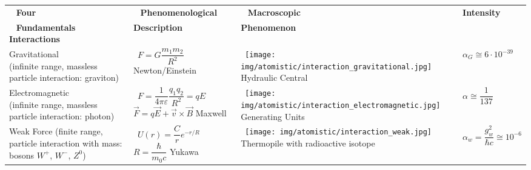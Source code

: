 	 \begin{table}[H]
		\begin{center}
		 \begin{tabular}{|m{5.5cm}|m{3.5cm}|m{3cm}|m{3cm}|}
		 \hline 
		 \centering\arraybackslash\ \cellcolor{black!30} \textbf{Four} & \centering\arraybackslash\ \cellcolor{black!30} \textbf{Phenomenological} & \centering\arraybackslash\ \cellcolor{black!30} \textbf{Macroscopic}  & \centering\arraybackslash\ \cellcolor{black!30}\textbf{Intensity} \\ 
		 \centering\arraybackslash\ \cellcolor{black!30} \textbf{Fundamentals Interactions} & \centering  \cellcolor{black!30} \textbf{Description} & \centering  \cellcolor{black!30} \textbf{Phenomenon}  & \cellcolor{black!30} \\ 
		 \hline 
		 \pbox{5cm}{Gravitational \\ \tiny (infinite range, massless particle interaction: graviton)} & \centering\arraybackslash\  \pbox{5cm}{$F=G\dfrac{m_1m_2}{R^2}$ \\ \tiny Newton/Einstein} &  \centering\arraybackslash\ \pbox{5cm}{\texttt{[image: img/atomistic/interaction\_gravitational.jpg]} \\ \tiny Hydraulic Central} & \centering\arraybackslash\ $\alpha_G\cong 6\cdot 10^{-39}$ \\ 
		 \hline 
		 \pbox{5cm}{Electromagnetic \\ \tiny (infinite range, massless particle interaction: photon)} & \centering\arraybackslash\ \pbox{5cm}{$F=\dfrac{1}{4\pi\varepsilon}\dfrac{q_1q_2}{R^2}=qE$ \\ $\vec{F}=q\vec{E}+\vec{v}\times\vec{B}$ \\ \tiny Maxwell} & \centering\arraybackslash\ \pbox{5cm}{\texttt{[image: img/atomistic/interaction\_electromagnetic.jpg]} \\ \tiny Generating Units} & \centering\arraybackslash\ $\alpha\cong \dfrac{1}{137}$ \\ 
		 \hline 
			\pbox{5cm}{Weak Force \\ \tiny (finite range, particle interaction with mass: bosons $W^{+}$, $W^{-}$, $Z^0$)} & \centering\arraybackslash\ \pbox{5cm}{$U(r)=\dfrac{C}{r}e^{-r/R}$ \\ $R=\dfrac{\hbar}{m_0c}$ \\ \tiny Yukawa} & \centering\arraybackslash\ \pbox{5cm}{\texttt{[image: img/atomistic/interaction\_weak.jpg]} \\ \tiny Thermopile with radioactive isotope} & \centering\arraybackslash\ $\alpha_w=\dfrac{g_w^2}{\hbar c}\cong 10^{-6}$ \\ 

\end{tabular}
\end{center}
\end{table}
